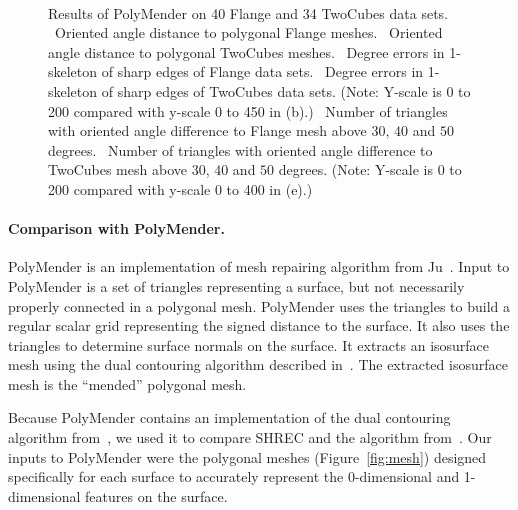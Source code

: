 \begin{figure}[p]
\quad
\\
\caption{Results of PolyMender on 40 Flange and 34 TwoCubes data sets.
\protect{}~Oriented angle distance to polygonal Flange meshes.
\protect{}~Oriented angle distance to polygonal TwoCubes meshes.
\protect{}~Degree errors in 1-skeleton of sharp edges of Flange data sets.
\protect{}~Degree errors in 1-skeleton of sharp edges of TwoCubes data sets.
(Note: Y-scale is 0 to 200 compared with y-scale 0 to 450 in (b).)
\protect{}~Number of triangles with oriented angle difference to Flange mesh 
above $30$, $40$ and $50$ degrees.
\protect{}~Number of triangles with oriented angle difference to TwoCubes mesh
above $30$, $40$ and $50$ degrees.
(Note: Y-scale is 0 to 200 compared with y-scale 0 to 400 in (e).)
}
\label{fig:polymenderA}
\end{figure}

\paragraph{Comparison with PolyMender.}

PolyMender is an implementation of mesh repairing algorithm from Ju~\cite{j-rrpm-04}.
Input to PolyMender is a set of triangles representing a surface,
but not necessarily properly connected in a polygonal mesh.
PolyMender uses the triangles to build a regular scalar grid
representing the signed distance to the surface.
It also uses the triangles to determine surface normals
on the surface.
It extracts an isosurface mesh using the dual contouring algorithm 
described in~\cite{jlsw-dchd-02,sw-dcss-02}.
The extracted isosurface mesh is the ``mended'' polygonal mesh.

Because PolyMender contains an implementation of the dual contouring algorithm
from~\cite{jlsw-dchd-02,sw-dcss-02},
we used it to compare SHREC and the algorithm from~\cite{jlsw-dchd-02,sw-dcss-02}.
Our inputs to PolyMender were the polygonal meshes
(Figure~\ref{fig:mesh})
designed specifically for each surface to accurately represent the 0-dimensional
and 1-dimensional features on the surface.

